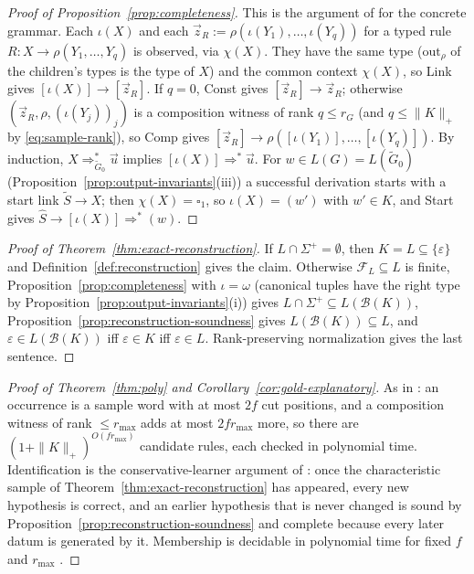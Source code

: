 \documentclass[11pt]{article}
\numberwithin{equation}{section}
\theoremstyle{plain}
\theoremstyle{definition}
\theoremstyle{remark}
\newcommand{\out}{\mathrm{out}}
\newcommand{\tuple}[1]{\vec{#1}}
\newcommand{\blank}{\square}
\newcommand{\eps}{\varepsilon}
\theoremstyle{plain}
\begin{document}
\begin{proof}[Proof of Proposition~\ref{prop:completeness}]
This is the argument of \cite[Lemma~3]{Yoshinaka2015General} for the concrete
grammar.  Each $\iota(X)$ and each
$\tuple z_R:=\rho(\iota(Y_1),\ldots,\iota(Y_q))$ for a typed rule
$R:X\to\rho(Y_1,\ldots,Y_q)$ is observed, via $\chi(X)$.  They have the same type
($\out_\rho$ of the children's types is the type of $X$) and the common context
$\chi(X)$, so Link gives $[\iota(X)]\to[\tuple z_R]$.  If $q=0$, Const gives
$[\tuple z_R]\to\tuple z_R$; otherwise $(\tuple z_R,\rho,(\iota(Y_j))_j)$ is a
composition witness of rank $q\le r_G$ (and $q\le\|K\|_+$ by \eqref{eq:sample-rank}),
so Comp gives $[\tuple z_R]\to\rho([\iota(Y_1)],\ldots,[\iota(Y_q)])$.  By induction,
$X\Rightarrow^*_{\widetilde G_0}\tuple u$ implies $[\iota(X)]\Rightarrow^*\tuple u$.  For
$w\in L(G)=L(\widetilde G_0)$ (Proposition~\ref{prop:output-invariants}(iii)) a
successful derivation starts with a start link $\widetilde S\to X$; then
$\chi(X)=\blank_1$, so $\iota(X)=(w')$ with $w'\in K$, and Start gives
$\widehat S\to[\iota(X)]\Rightarrow^*(w)$.
\end{proof}

\begin{proof}[Proof of Theorem~\ref{thm:exact-reconstruction}]
If $L\cap\Sigma^+=\emptyset$, then $K=L\subseteq\{\eps\}$ and
Definition~\ref{def:reconstruction} gives the claim.  Otherwise $\mathcal F_L\subseteq L$
is finite, Proposition~\ref{prop:completeness} with $\iota=\omega$ (canonical tuples have
the right type by Proposition~\ref{prop:output-invariants}(i)) gives
$L\cap\Sigma^+\subseteq L(\mathcal B(K))$, Proposition~\ref{prop:reconstruction-soundness}
gives $L(\mathcal B(K))\subseteq L$, and $\eps\in L(\mathcal B(K))$ iff $\eps\in K$ iff
$\eps\in L$.  Rank-preserving normalization gives the last sentence.
\end{proof}

\begin{proof}[Proof of Theorem~\ref{thm:poly} and Corollary~\ref{cor:gold-explanatory}]
As in \cite[Lemma~6]{Yoshinaka2011}: an occurrence is a sample word with at most
$2f$ cut positions, and a composition witness of rank $\le r_{\max}$ adds at most
$2fr_{\max}$ more, so there are $(1+\|K\|_+)^{O(fr_{\max})}$ candidate rules, each
checked in polynomial time.  Identification is the conservative-learner argument
of \cite[Corollary~1 and Theorem~1]{Yoshinaka2011}: once the characteristic
sample of Theorem~\ref{thm:exact-reconstruction} has appeared, every new
hypothesis is correct, and an earlier hypothesis that is never changed is
sound by Proposition~\ref{prop:reconstruction-soundness} and complete because
every later datum is generated by it.  Membership is decidable in polynomial
time for fixed $f$ and $r_{\max}$ \cite[Proposition~4]{Yoshinaka2011}.
\end{proof}
\end{document}
